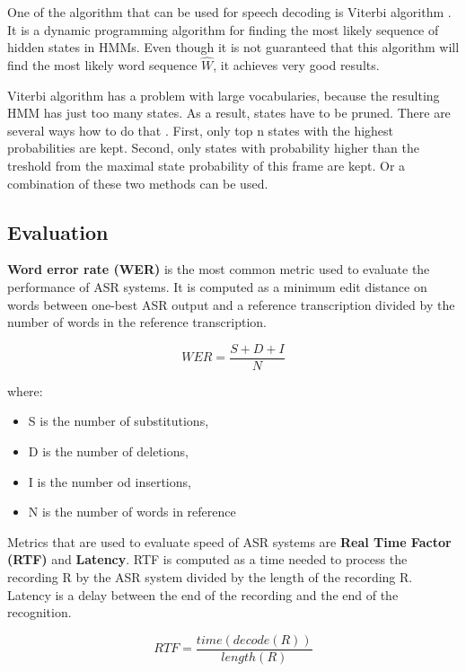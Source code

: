 One of the algorithm that can be used for speech decoding is Viterbi algorithm \cite{forney1973viterbi}.
It is a dynamic programming algorithm for finding the most likely sequence of hidden states in HMMs.
Even though it is not guaranteed that this algorithm will find the most likely word sequence $\widehat{W}$,
  it achieves very good results.

Viterbi algorithm has a problem with large vocabularies,
  because the resulting HMM has just too many states.
As a result, states have to be pruned.
There are several ways how to do that \cite{jang2002optimization}.
First, only top n states with the highest probabilities are kept.
Second, only states with probability higher than the treshold from the maximal state probability of this frame are kept.
Or a combination of these two methods can be used.


\subsection{Evaluation}
\textbf{Word error rate (WER)} is the most common metric used to evaluate the performance of ASR systems.
It is computed as a minimum edit distance on words between one-best ASR output and a reference transcription divided by the number of words in the reference transcription.

\begin{equation}
  WER = \frac{S + D + I}{N}
\end{equation}

where:
\begin{itemize}
  \item S is the number of substitutions,
  \item D is the number of deletions,
  \item I is the number od insertions,
  \item N is the number of words in reference
\end{itemize}

Metrics that are used to evaluate speed of ASR systems are \textbf{Real Time Factor (RTF)} and \textbf{Latency}.
RTF is computed as a time needed to process the recording R by the ASR system divided by the length of the recording R.
Latency is a delay between the end of the recording and the end of the recognition.

\begin{equation}
  RTF = \frac{time(decode(R))}{length(R)}
\end{equation}


